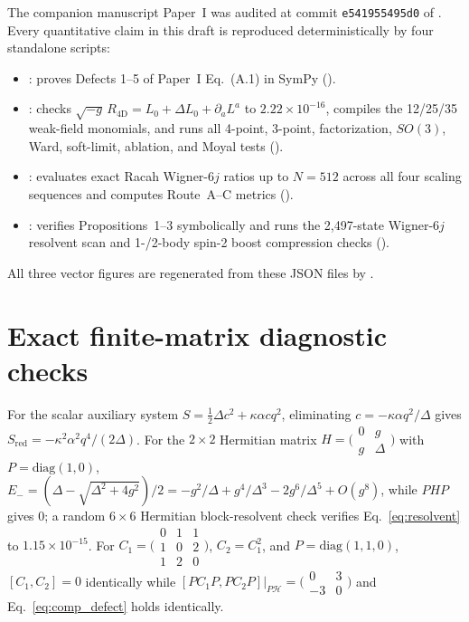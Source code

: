 \documentclass[11pt]{article}
\newcommand{\calH}{\mathcal{H}}
\begin{document}
The companion manuscript Paper~I was audited at commit \texttt{e541955495d0} of . Every quantitative claim in this draft is reproduced deterministically by four standalone scripts:
\begin{itemize}
\item {}: proves Defects 1--5 of Paper~I Eq.~(A.1) in SymPy ().
\item {}: checks $\sqrt{-g}\,R_{4\mathrm{D}} = L_0 + \Delta L_0 + \partial_a L^a$ to $2.22\times 10^{-16}$, compiles the 12/25/35 weak-field monomials, and runs all 4-point, 3-point, factorization, $SO(3)$, Ward, soft-limit, ablation, and Moyal tests ().
\item {}: evaluates exact Racah Wigner-$6j$ ratios up to $N=512$ across all four scaling sequences and computes Route~A--C metrics ().
\item {}: verifies Propositions~1--3 symbolically and runs the 2,497-state Wigner-$6j$ resolvent scan and 1-/2-body spin-2 boost compression checks ().
\end{itemize}
All three vector figures are regenerated from these JSON files by .

\section{Exact finite-matrix diagnostic checks}\label{app:analytic}

For the scalar auxiliary system $S = \frac{1}{2}\Delta c^2 + \kappa\alpha c q^2$, eliminating $c = -\kappa\alpha q^2/\Delta$ gives $S_{\mathrm{red}} = -\kappa^2\alpha^2 q^4/(2\Delta)$. For the $2\times 2$ Hermitian matrix $H = \bigl(\begin{smallmatrix}0 & g\\ g & \Delta\end{smallmatrix}\bigr)$ with $P = \mathrm{diag}(1,0)$, $E_- = (\Delta - \sqrt{\Delta^2 + 4g^2})/2 = -g^2/\Delta + g^4/\Delta^3 - 2g^6/\Delta^5 + O(g^8)$, while $PHP$ gives $0$; a random $6\times 6$ Hermitian block-resolvent check verifies Eq.~\eqref{eq:resolvent} to $1.15\times 10^{-15}$. For $C_1 = \bigl(\begin{smallmatrix}0&1&1\\ 1&0&2\\ 1&2&0\end{smallmatrix}\bigr)$, $C_2 = C_1^2$, and $P = \mathrm{diag}(1,1,0)$, $[C_1,C_2]=0$ identically while $[PC_1P,PC_2P]|_{P\calH} = \bigl(\begin{smallmatrix}0&3\\ -3&0\end{smallmatrix}\bigr)$ and Eq.~\eqref{eq:comp_defect} holds identically.
\end{document}
